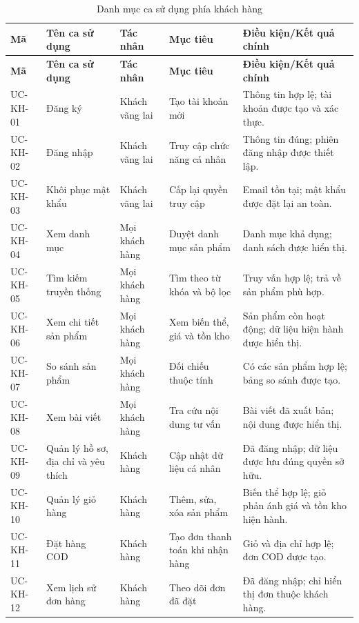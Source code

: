 \begin{longtable}{|p{}|p{}|p{}|p{}|p{}|}
    \caption{Danh mục ca sử dụng phía khách hàng}\label{tab:usecase-customer-summary}\\
    \hline
    \textbf{Mã} & \textbf{Tên ca sử dụng} & \textbf{Tác nhân} & \textbf{Mục tiêu} & \textbf{Điều kiện/Kết quả chính} \\ \hline
    \endfirsthead
    \hline
    \textbf{Mã} & \textbf{Tên ca sử dụng} & \textbf{Tác nhân} & \textbf{Mục tiêu} & \textbf{Điều kiện/Kết quả chính} \\ \hline
    \endhead
    UC-KH-01 & Đăng ký & Khách vãng lai & Tạo tài khoản mới & Thông tin hợp lệ; tài khoản được tạo và xác thực. \\ \hline
    UC-KH-02 & Đăng nhập & Khách vãng lai & Truy cập chức năng cá nhân & Thông tin đúng; phiên đăng nhập được thiết lập. \\ \hline
    UC-KH-03 & Khôi phục mật khẩu & Khách vãng lai & Cấp lại quyền truy cập & Email tồn tại; mật khẩu được đặt lại an toàn. \\ \hline
    UC-KH-04 & Xem danh mục & Mọi khách hàng & Duyệt danh mục sản phẩm & Danh mục khả dụng; danh sách được hiển thị. \\ \hline
    UC-KH-05 & Tìm kiếm truyền thống & Mọi khách hàng & Tìm theo từ khóa và bộ lọc & Truy vấn hợp lệ; trả về sản phẩm phù hợp. \\ \hline
    UC-KH-06 & Xem chi tiết sản phẩm & Mọi khách hàng & Xem biến thể, giá và tồn kho & Sản phẩm còn hoạt động; dữ liệu hiện hành được hiển thị. \\ \hline
    UC-KH-07 & So sánh sản phẩm & Mọi khách hàng & Đối chiếu thuộc tính & Có các sản phẩm hợp lệ; bảng so sánh được tạo. \\ \hline
    UC-KH-08 & Xem bài viết & Mọi khách hàng & Tra cứu nội dung tư vấn & Bài viết đã xuất bản; nội dung được hiển thị. \\ \hline
    UC-KH-09 & Quản lý hồ sơ, địa chỉ và yêu thích & Khách hàng & Cập nhật dữ liệu cá nhân & Đã đăng nhập; dữ liệu được lưu đúng quyền sở hữu. \\ \hline
    UC-KH-10 & Quản lý giỏ hàng & Khách hàng & Thêm, sửa, xóa sản phẩm & Biến thể hợp lệ; giỏ phản ánh giá và tồn kho hiện hành. \\ \hline
    UC-KH-11 & Đặt hàng COD & Khách hàng & Tạo đơn thanh toán khi nhận hàng & Giỏ và địa chỉ hợp lệ; đơn COD được tạo. \\ \hline
    UC-KH-12 & Xem lịch sử đơn hàng & Khách hàng & Theo dõi đơn đã đặt & Đã đăng nhập; chỉ hiển thị đơn thuộc khách hàng. \\ \hline

\end{longtable}
